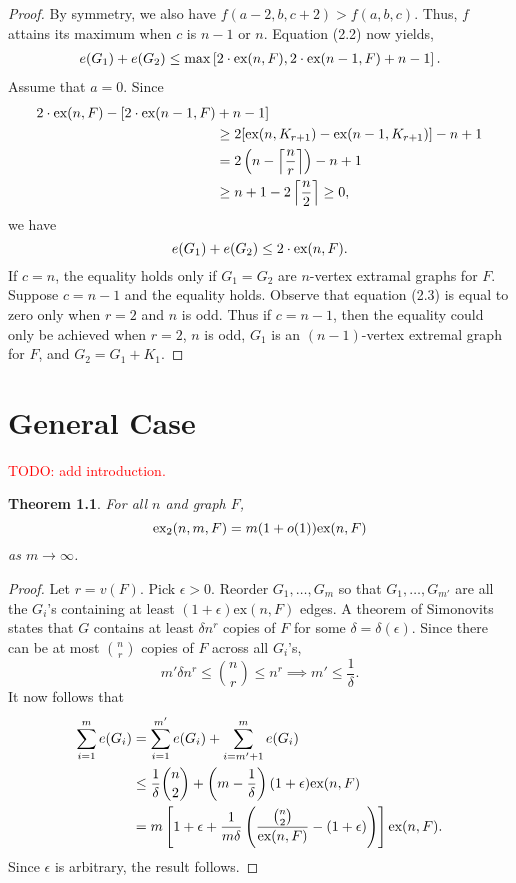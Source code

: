 \documentclass[12pt]{report}
\newtheorem{theorem}{Theorem}[chapter]
\newcommand*{\ex}{\textnormal{ex}}
\newcommand*{\dex}{\textnormal{ex}_2}
\begin{document}
\begin{proof}
  By symmetry, we also have $f(a - 2, b, c + 2) > f(a, b, c)$. Thus, $f$ attains its maximum when $c$ is $n - 1$ or $n$. Equation (2.2) now yields, 
  \begin{align*}
    e(G_1) + e(G_2) \leq \max\left[2 \cdot \ex(n, F), 2 \cdot \ex(n - 1, F) + n - 1\right].
  \end{align*}
  Assume that $a = 0$. Since
  \begin{align}
    2 \cdot \ex(n, F) - 
    [2 \cdot \ex(n - 1, F) &+ n - 1] \nonumber \\
    &\geq 2[\ex(n, K_{r + 1}) - \ex(n - 1, K_{r + 1})] - n + 1 \\
    &= 2\left(n - \left\lceil \frac{n}{r} \right\rceil\right) - n + 1 \nonumber  \\
    &\geq n + 1 - 2\left\lceil \frac{n}{2} \right\rceil \geq 0,  \nonumber 
  \end{align}
  we have
  \[
    e(G_1) + e(G_2) \leq 2 \cdot \ex(n, F).
  \]
  If $c = n$, the equality holds only if $G_1 = G_2$ are $n$-vertex extramal graphs for $F$. Suppose $c = n - 1$ and the equality holds. Observe that equation (2.3) is equal to zero only when $r = 2$ and $n$ is odd. Thus if $c = n - 1$, then the equality could only be achieved when $r = 2$, $n$ is odd, $G_1$ is an $(n - 1)$-vertex extremal graph for $F$, and $G_2 = G_1 + K_1$.
\end{proof}

\chapter{General Case}

\textcolor{red}{TODO: add introduction.}

\begin{theorem}
  For all $n$ and graph $F$,
  \[
    \dex(n, m, F) = m(1 + o(1))\ex(n, F)
  \]
  as $m \to \infty$.
\end{theorem}

\begin{proof}
  Let $r = v(F)$. Pick $\epsilon > 0$. Reorder $G_1, \ldots, G_m$ so that $G_1, \ldots, G_{m'}$ are all the $G_i$'s containing at least $(1 + \epsilon)\text{ex}(n, F)$ edges. A theorem of Simonovits states that $G$ contains at least $\delta n^r$ copies of $F$ for some $\delta = \delta(\epsilon)$. Since there can be at most $\binom{n}{r}$ copies of $F$ across all $G_i$'s, 
  \[
    m'\delta n^{r} \leq \binom{n}{r} \leq n^r \implies m' \leq \frac{1}{\delta}.
  \]
  It now follows that
  \begin{align*}
    \sum_{i = 1}^m e(G_i) 
    &= \sum_{i = 1}^{m'} e(G_i) + \sum_{i = m' + 1}^m e(G_i) \\
    &\leq \frac{1}{\delta}\binom{n}{2} + \left(m - \frac{1}{\delta}\right)(1 + \epsilon)\text{ex}(n, F) \\
    &= m\left[1 + \epsilon + \frac{1}{m\delta}\left(\frac{\binom{n}{2}}{\ex(n, F)} - (1 + \epsilon)\right)\right]\ex(n, F).
  \end{align*}
  Since $\epsilon$ is arbitrary, the result follows.
\end{proof}
\end{document}
